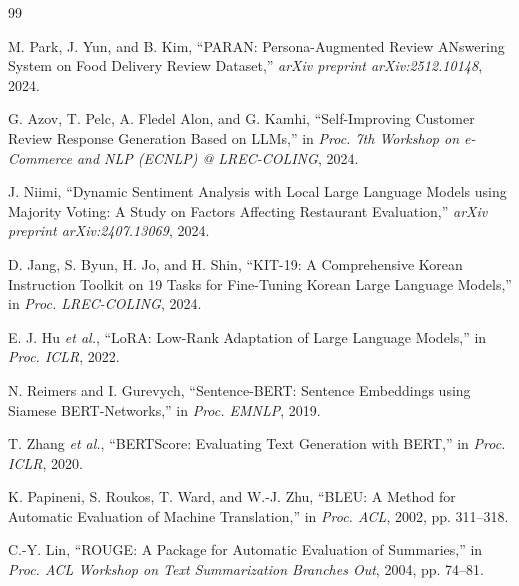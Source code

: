 \documentclass[conference]{IEEEtran}
\begin{document}
\begin{thebibliography}{99}

M. Park, J. Yun, and B. Kim,
``PARAN: Persona-Augmented Review ANswering System on Food Delivery
Review Dataset,''
\textit{arXiv preprint arXiv:2512.10148}, 2024.

G. Azov, T. Pelc, A. Fledel Alon, and G. Kamhi,
``Self-Improving Customer Review Response Generation Based on LLMs,''
in \textit{Proc. 7th Workshop on e-Commerce and NLP (ECNLP)
@ LREC-COLING}, 2024.

J. Niimi,
``Dynamic Sentiment Analysis with Local Large Language Models using
Majority Voting: A Study on Factors Affecting Restaurant Evaluation,''
\textit{arXiv preprint arXiv:2407.13069}, 2024.

D. Jang, S. Byun, H. Jo, and H. Shin,
``KIT-19: A Comprehensive Korean Instruction Toolkit on 19 Tasks for
Fine-Tuning Korean Large Language Models,''
in \textit{Proc. LREC-COLING}, 2024.

E. J. Hu \textit{et al.},
``LoRA: Low-Rank Adaptation of Large Language Models,''
in \textit{Proc. ICLR}, 2022.

N. Reimers and I. Gurevych,
``Sentence-BERT: Sentence Embeddings using Siamese BERT-Networks,''
in \textit{Proc. EMNLP}, 2019.

T. Zhang \textit{et al.},
``BERTScore: Evaluating Text Generation with BERT,''
in \textit{Proc. ICLR}, 2020.

K. Papineni, S. Roukos, T. Ward, and W.-J. Zhu,
``BLEU: A Method for Automatic Evaluation of Machine Translation,''
in \textit{Proc. ACL}, 2002, pp. 311--318.

C.-Y. Lin,
``ROUGE: A Package for Automatic Evaluation of Summaries,''
in \textit{Proc. ACL Workshop on Text Summarization Branches Out},
2004, pp. 74--81.

\end{thebibliography}
\end{document}
